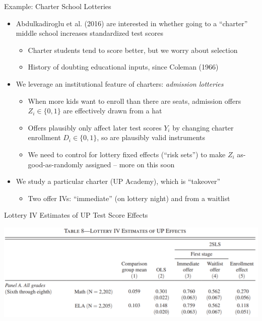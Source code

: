 \documentclass{beamer}
\begin{document}
\begin{frame}{Example: Charter School Lotteries}
\begin{itemize}
\item Abdulkadiroglu et al. (2016) are interested in whether going to a ``charter'' middle school increases standardized test scores\smallskip
\begin{itemize}
\item Charter students tend to score better, but we worry about selection
\smallskip
\item History of doubting educational inputs, since Coleman (1966)
\end{itemize}
\medskip\pause{}
\item We leverage an institutional feature of charters: \emph{admission lotteries}\smallskip
\begin{itemize}
\item When more kids want to enroll than there are seats, admission offers $Z_i\in\{0,1\}$ are effectively drawn from a hat
\smallskip
\item Offers plausibly only affect later test scores $Y_i$ by changing charter enrollment $D_i\in\{0,1\}$, so are plausibly valid instruments
\smallskip
\item We need to control for lottery fixed effects (``risk sets'') to make $Z_i$ as-good-as-randomly assigned -- more on this soon
\end{itemize}
\medskip\pause{}
\item We study a particular charter (UP Academy), which is ``takeover''\smallskip
\begin{itemize}
\item Two offer IVs: ``immediate'' (on lottery night) and from a waitlist
\end{itemize}
\end{itemize}
\end{frame}

\begin{frame}{Lottery IV Estimates of UP Test Score Effects}

\begin{center}
\includegraphics[scale=0.32]{./lecture_includes/charters1.png}
\end{center}

\end{frame}
\end{document}
